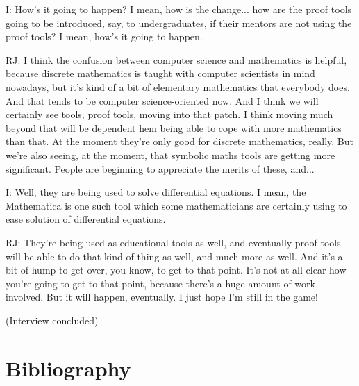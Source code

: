 \documentclass[10pt,titlepage]{book}
\begin{document}
I: How's it going to happen? I mean, how is the change... how are the proof tools going to be introduced, say, to undergraduates, if their mentors are not using the proof tools? I mean, how's it going to happen.

RJ: I think the confusion between computer science and mathematics is helpful, because discrete mathematics is taught with computer scientists in mind nowadays, but it's kind of a bit of elementary mathematics that everybody does. And that tends to be computer science-oriented now. And I think we will certainly see tools, proof tools, moving into that patch. I think moving much beyond that will be dependent hem being able to cope with more mathematics than that. At the moment they're only good for discrete mathematics, really. But we're also seeing, at the moment, that symbolic maths tools are getting more significant. People are beginning to appreciate the merits of these, and...

I: Well, they are being used to solve differential equations. I mean, the Mathematica is one such tool which some mathematicians are certainly using to ease solution of differential equations.

RJ: They're being used as educational tools as well, and eventually proof tools will be able to do that kind of thing as well, and much more as well. And it's a bit of hump to get over, you know, to get to that point. It's not at all clear how you're going to get to that point, because there's a huge amount of work involved. But it will happen, eventually. I just hope I'm still in the game!

(Interview concluded)

\backmatter
\section*{Bibliography}\label{bibliography}



\end{document}
